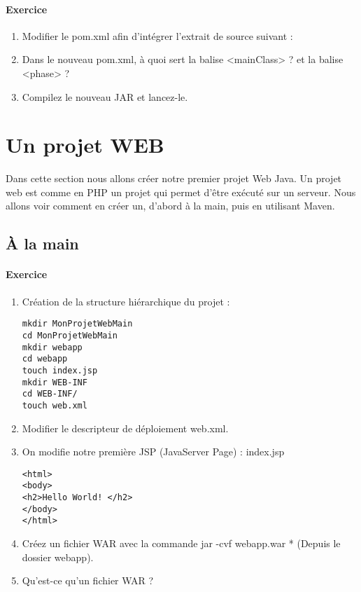 \documentclass[a4,12pt]{article}
\begin{document}
\paragraph{Exercice}
\begin{enumerate}
	\item Modifier le pom.xml afin d'intégrer l'extrait de source suivant :

	\item Dans le nouveau pom.xml, à quoi sert la balise <mainClass> ? et la balise <phase> ?
	\item Compilez le nouveau JAR et lancez-le.
\end{enumerate}


\section{Un projet WEB}

Dans cette section nous allons créer notre premier projet Web Java. Un projet web est comme en PHP un projet qui permet d'être exécuté sur un serveur. Nous allons voir comment en créer un, d'abord à la main, puis en utilisant Maven.

\subsection{À la main}

\paragraph{Exercice}
\begin{enumerate}
\item Création de la structure hiérarchique du projet :
\lstset{language=bash}
\begin{lstlisting}
mkdir MonProjetWebMain
cd MonProjetWebMain
mkdir webapp
cd webapp
touch index.jsp
mkdir WEB-INF
cd WEB-INF/
touch web.xml
\end{lstlisting}


\item  Modifier le descripteur de déploiement web.xml.




\item On modifie notre première JSP (JavaServer Page) : index.jsp
\lstset{language=html}
\begin{lstlisting}
<html>
<body>
<h2>Hello World! </h2>
</body>
</html>
\end{lstlisting}

\item Créez un fichier WAR avec la commande jar -cvf webapp.war * (Depuis le dossier webapp).
\item Qu'est-ce qu'un fichier WAR ?
\end{enumerate}
\end{document}
